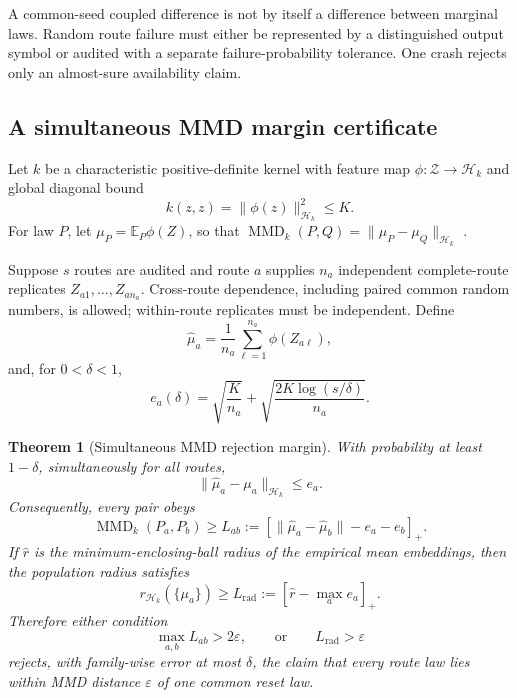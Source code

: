 \documentclass[10pt]{article}
\newtheorem{theorem}{Theorem}[section]
\theoremstyle{definition}
\theoremstyle{remark}
\newcommand{\MMD}{\operatorname{MMD}}
\newcommand{\eps}{\varepsilon}
\newcommand{\cH}{\mathcal{H}}
\newcommand{\cZ}{\mathcal{Z}}
\newcommand{\EE}{\mathbb{E}}
\begin{document}
A common-seed coupled difference is not by itself a difference between
marginal laws. Random route failure must either be represented by a
distinguished output symbol or audited with a separate failure-probability
tolerance. One crash rejects only an almost-sure availability claim.

\subsection{A simultaneous MMD margin certificate}

Let \(k\) be a characteristic positive-definite kernel with feature map
\(\phi:\cZ\to\cH_k\) and global diagonal bound
\[
  k(z,z)=\|\phi(z)\|_{\cH_k}^2\le K.
\]
For law \(P\), let \(\mu_P=\EE_P\phi(Z)\), so that
\(\MMD_k(P,Q)=\|\mu_P-\mu_Q\|_{\cH_k}\)
\citep{gretton2012}.

Suppose \(s\) routes are audited and route \(a\) supplies \(n_a\) independent
complete-route replicates \(Z_{a1},\ldots,Z_{an_a}\). Cross-route dependence,
including paired common random numbers, is allowed; within-route replicates
must be independent. Define
\[
 \widehat\mu_a=\frac1{n_a}\sum_{\ell=1}^{n_a}\phi(Z_{a\ell}),
\]
and, for \(0<\delta<1\),
\[
 e_a(\delta)
 =
 \sqrt{\frac K{n_a}}
 +
 \sqrt{\frac{2K\log(s/\delta)}{n_a}}.
 \tag{5.1}
\]

\begin{theorem}[Simultaneous MMD rejection margin]
\label{thm:mmd}
With probability at least \(1-\delta\), simultaneously for all routes,
\[
 \|\widehat\mu_a-\mu_a\|_{\cH_k}\le e_a.
 \tag{5.2}\label{eq:mmd-event}
\]
Consequently, every pair obeys
\[
 \MMD_k(P_a,P_b)
 \ge
 L_{ab}
 :=
 \left[
 \|\widehat\mu_a-\widehat\mu_b\|-e_a-e_b
 \right]_+.
 \tag{5.3}\label{eq:mmd-pair}
\]
If \(\widehat r\) is the minimum-enclosing-ball radius of the empirical mean
embeddings, then the population radius satisfies
\[
 r_{\cH_k}(\{\mu_a\})
 \ge
 L_{\mathrm{rad}}
 :=
 \left[\widehat r-\max_a e_a\right]_+.
 \tag{5.4}\label{eq:mmd-radius}
\]
Therefore either condition
\[
  \max_{a,b}L_{ab}>2\eps,
  \qquad\text{or}\qquad
  L_{\mathrm{rad}}>\eps
  \tag{5.5}\label{eq:mmd-reject}
\]
rejects, with family-wise error at most \(\delta\), the claim that every route
law lies within MMD distance \(\eps\) of one common reset law.
\end{theorem}
\end{document}
